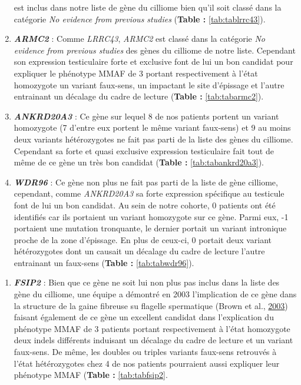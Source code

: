 \documentclass[12pt,twoside]{reedthesis}
\providecommand{\tightlist}{%
  \setlength{\itemsep}{0pt}\setlength{\parskip}{0pt}}
\theoremstyle{definition}
\theoremstyle{definition}
\theoremstyle{remark}
\begin{document}
\begin{enumerate}
    est inclus dans notre liste de gène du cilliome bien qu'il soit classé
    dans la catégorie \emph{No evidence from previous studies}
    (\textbf{Table : }\ref{tab:tablrrc43}).
  \item
    \textbf{\emph{ARMC2}} : Comme \emph{LRRC43}, \emph{ARMC2} est classé
    dans la catégorie \emph{No evidence from previous studies} des gènes
    du cilliome de notre liste. Cependant son expression testiculaire
    forte et exclusive font de lui un bon candidat pour expliquer le
    phénotype MMAF de 3 portant respectivement à l'état homozygote un
    variant faux-sens, un impactant le site d'épissage et l'autre
    entrainant un décalage du cadre de lecture (\textbf{Table :
    }\ref{tab:tabarmc2}).
  \item
    \textbf{\emph{ANKRD20A3}} : Ce gène sur lequel 8 de nos patients
    portent un variant homozygote (7 d'entre eux portent le même variant
    faux-sens) et 9 au moins deux variants hétérozygotes ne fait pas parti
    de la liste des gènes du cilliome. Cependant sa forte et quasi
    exclusive expression testiculaire fait tout de même de ce gène un très
    bon candidat (\textbf{Table : }\ref{tab:tabankrd20a3}).
  \item
    \textbf{\emph{WDR96}} : Ce gène non plus ne fait pas parti de la liste
    de gène cilliome, cependant, comme \emph{ANKRD20A3} sa forte
    expression spécifique au testicule font de lui un bon candidat. Au
    sein de notre cohorte, 0 patients ont été identifiés car ils portaient
    un variant homozygote sur ce gène. Parmi eux, -1 portaient une
    mutation tronquante, le dernier portait un variant intronique proche
    de la zone d'épissage. En plus de ceux-ci, 0 portait deux variant
    hétérozygotes dont un causait un décalage du cadre de lecture l'autre
    entrainant un faux-sens (\textbf{Table : }\ref{tab:tabwdr96}).
  \end{enumerate}
  
  \newpage
  
  \begin{enumerate}
  \def\labelenumi{\arabic{enumi}.}
  \setcounter{enumi}{6}
  \tightlist
  \item
    \textbf{\emph{FSIP2}} : Bien que ce gène ne soit lui non plus pas
    inclus dans la liste des gène du cilliome, une équipe a démontré en
    2003 l'implication de ce gène dans la structure de la gaine fibreuse
    su flagelle spermatique (Brown et al.,
    \protect\hyperlink{ref-Brown2003}{2003}) faisant également de ce gène
    un excellent candidat dans l'explication du phénotype MMAF de 3
    patients portant respectivement à l'état homozygote deux indels
    différents induisant un décalage du cadre de lecture et un variant
    faux-sens. De même, les doubles ou triples variants faux-sens
    retrouvés à l'état hétérozygotes chez 4 de nos patients pourraient
    aussi expliquer leur phénotype MMAF (\textbf{Table :
    }\ref{tab:tabfsip2}.
  \end{enumerate}
  
\end{document}
